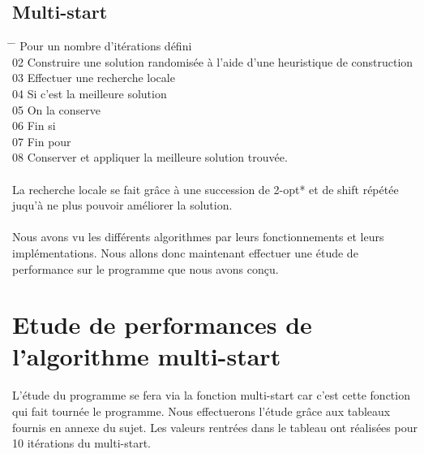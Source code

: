 \documentclass[12pt]{article}
\begin{document}
\subsection{Multi-start}

\begin{tabbing}
\hspace{1cm} \= \hspace{1cm} \=   Pour un nombre d'itérations défini\\
02  \> Construire une solution randomisée à l'aide d'une heuristique de construction\\
03  \> Effectuer une recherche locale \\
04  \> Si c'est la meilleure solution \\
05  \> \> On la conserve\\
06  \> Fin si\\
07  Fin pour\\
08  Conserver et appliquer la meilleure solution trouvée.\\
\end{tabbing}

\paragraph{}
La recherche locale se fait grâce à une succession de 2-opt* et de shift répétée juqu'à ne plus pouvoir améliorer la solution.


\paragraph{}
Nous avons vu les différents algorithmes par leurs fonctionnements et leurs implémentations. Nous allons donc maintenant effectuer une étude de performance sur 
le programme que nous avons conçu.

\clearpage
\section{Etude de performances de l'algorithme multi-start}
L'étude du programme se fera via la fonction multi-start car c'est cette fonction qui fait tournée le programme. Nous effectuerons l'étude grâce aux tableaux 
fournis en annexe du sujet. Les valeurs rentrées dans le tableau ont réalisées pour 10 itérations du multi-start.\\\
\end{document}
